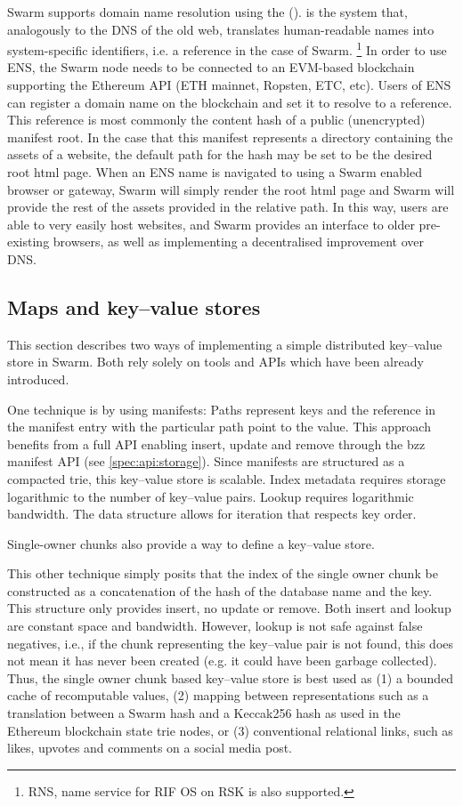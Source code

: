 Swarm supports domain name resolution using the  ().  is the system that, analogously to the DNS of the old web, translates human-readable names into system-specific identifiers, i.e. a reference in the case of Swarm.%
\footnote{RNS, name service for RIF OS on RSK is also supported.}
%
In order to use ENS, the Swarm node needs to be connected to an EVM-based blockchain supporting the Ethereum API (ETH mainnet, Ropsten, ETC, etc). 
Users of ENS can register a domain name on the blockchain and set it to resolve to a reference. This reference is most commonly the content hash of a public (unencrypted) manifest root. In the case that this manifest represents a directory containing the assets of a website, the default path for the hash may be set to be the desired root html page. When an ENS name is navigated to using a Swarm enabled browser or gateway, Swarm will simply render the root html page and Swarm will provide the rest of the assets provided in the relative path. In this way, users are able to very easily host websites, and Swarm provides an interface to older pre-existing browsers, as well as implementing a decentralised improvement over DNS.


\subsection{Maps and key--value stores\statusgreen}\label{sec:maps}

This section describes two ways of implementing a simple distributed key--value store in Swarm. Both rely solely on tools and APIs which have been already introduced.

One technique is by using manifests: Paths represent keys and the reference in the manifest entry with the particular path point to the value. This approach benefits from a full API enabling insert, update and remove through the bzz manifest API (see \ref{spec:api:storage}). Since manifests are structured as a compacted trie, this key--value store is scalable. Index metadata requires storage logarithmic to the number of key--value pairs. Lookup requires logarithmic bandwidth. The data structure allows for iteration that respects key order. 

Single-owner chunks also provide a way to define a key--value store.

This other technique simply posits that the index of the single owner chunk be constructed as a concatenation of the hash of the database name and the key. This structure only provides insert, no update or remove. Both insert and lookup are constant space and bandwidth. However, lookup is not safe against false negatives, i.e., if the chunk representing the key--value pair is not found, this does not mean it has never been created (e.g. it could have been garbage collected). Thus, the single owner chunk based key--value store is best used as (1) a bounded cache of recomputable values, (2) mapping between representations such as a translation between a Swarm hash and a Keccak256 hash as used in the Ethereum blockchain state trie nodes, or (3) conventional relational links, such as likes, upvotes and comments on a social media post. 


